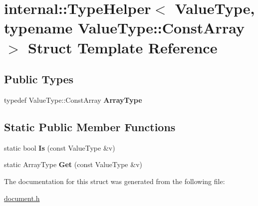 \hypertarget{a02064}{}\section{internal\+:\+:Type\+Helper$<$ Value\+Type, typename Value\+Type\+:\+:Const\+Array $>$ Struct Template Reference}
\label{a02064}
\subsection*{Public Types}
\begin{DoxyCompactItemize}
\item 
\mbox{\label{a02064_a88c3a7bbff09fdd44ce6980f8122ba05}} 
typedef Value\+Type\+::\+Const\+Array {\bfseries Array\+Type}
\end{DoxyCompactItemize}
\subsection*{Static Public Member Functions}
\begin{DoxyCompactItemize}
\item 
\mbox{\label{a02064_a259497292f89c58789b1e947249dd299}} 
static bool {\bfseries Is} (const Value\+Type \&v)
\item 
\mbox{\label{a02064_a247811db25d6f25cc63175e03d847b8b}} 
static Array\+Type {\bfseries Get} (const Value\+Type \&v)
\end{DoxyCompactItemize}


The documentation for this struct was generated from the following file\+:\begin{DoxyCompactItemize}
\item 
\hyperlink{a00476}{document.\+h}\end{DoxyCompactItemize}
